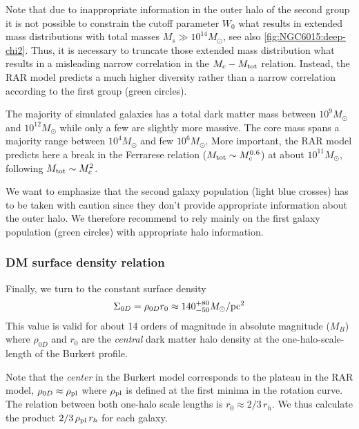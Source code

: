 Note that due to inappropriate information in the outer halo of the second group it is not possible to constrain the cutoff parameter $W_0$ what results in extended mass distributions with total masses $M_s \gg 10^{14} M_\odot$, see also \cref{fig:NGC6015:deep-chi2}. Thus, it is necessary to truncate those extended mass distribution what results in a misleading narrow correlation in the $M_c - M_{\rm tot}$ relation. Instead, the RAR model predicts a much higher diversity rather than a narrow correlation according to the first group (green circles).

The majority of simulated galaxies has a total dark matter mass between $10^{9} M_\odot$ and $10^{12} M_\odot$ while only a few are slightly more massive. The core mass spans a majority range between $10^{4} M_\odot$ and few $10^{6} M_\odot$. More important, the RAR model predicts here a break in the Ferrarese relation ($M_{\rm tot} \sim M_c^{0.6}$) at about $10^{11} M_\odot$, following $M_{\rm tot} \sim M_c^2$.

We want to emphasize that the second galaxy population (light blue crosses) has to be taken with caution since they don't provide appropriate information about the outer halo. We therefore recommend to rely mainly on the first galaxy population (green circles) with appropriate halo information.


\subsubsection{DM surface density relation}
Finally, we turn to the constant surface density \citep{2009MNRAS.397.1169D} \begin{equation}
	\Sigma_{0D} = \rho_{0D} r_0 \approx 140_{-50}^{+80} M_\odot/{\rm pc}^2
\end{equation} This value is valid for about 14 orders of magnitude in absolute magnitude ($M_B$) where $\rho_{0D}$ and $r_0$ are the \textit{central} dark matter halo density at the one-halo-scale-length of the Burkert profile.

Note that the \textit{center} in the Burkert model corresponds to the plateau in the RAR model, $\rho_{0D} \approx \rho_{\rm pl}$ where $\rho_{\rm pl}$ is defined at the first minima in the rotation curve. The relation between both one-halo scale lengths is $r_0\approx 2/3\, r_h$. We thus calculate the product $2/3\,\rho_{\rm pl}\,r_h$ for each galaxy.


